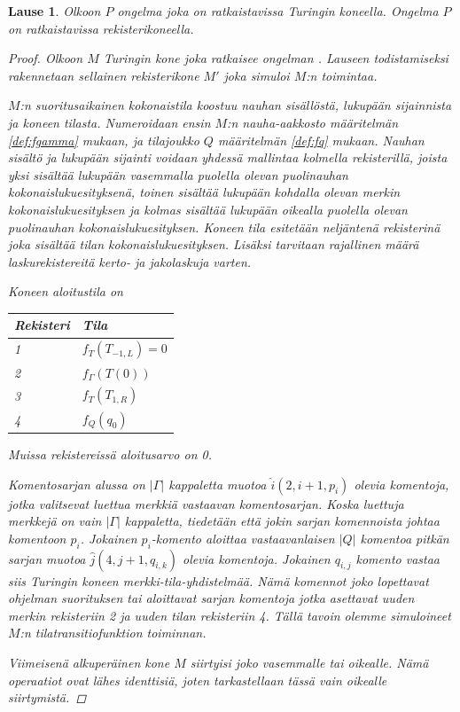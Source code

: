 \documentclass[a4paper, 12pt]{article}
\theoremstyle{definition}
\theoremstyle{plain}
\newtheorem{teor}[mydef]{Lause}
\begin{document}
\begin{teor}
\label{teor:turreg}
Olkoon $P$ ongelma joka on ratkaistavissa Turingin koneella. Ongelma $P$ on ratkaistavissa rekisterikoneella.
\begin{proof}
Olkoon $M$ Turingin kone joka ratkaisee ongelman . Lauseen todistamiseksi rakennetaan sellainen rekisterikone $M'$ joka simuloi $M$:n toimintaa.

$M$:n suoritusaikainen kokonaistila koostuu nauhan sisällöstä, lukupään sijainnista ja koneen tilasta. Numeroidaan ensin $M$:n nauha-aakkosto määritelmän \ref{def:fgamma} mukaan, ja tilajoukko $Q$ määritelmän \ref{def:fq} mukaan. Nauhan sisältö ja lukupään sijainti voidaan yhdessä mallintaa kolmella rekisterillä, joista yksi sisältää lukupään vasemmalla puolella olevan puolinauhan kokonaislukuesityksenä, toinen sisältää lukupään kohdalla olevan merkin kokonaislukuesityksen ja kolmas sisältää lukupään oikealla puolella olevan puolinauhan kokonaislukuesityksen. Koneen tila esitetään neljäntenä rekisterinä joka sisältää tilan kokonaislukuesityksen. Lisäksi tarvitaan rajallinen määrä laskurekistereitä kerto- ja jakolaskuja varten.

Koneen aloitustila on
\begin{center}
\begin{tabular}{l l}
Rekisteri & Tila \\
\hline
1 & $f_T(T_{-1, L}) = 0$ \\
2 & $f_{\Gamma}(T(0))$ \\
3 & $f_T(T_{1, R})$ \\
4 & $f_Q(q_0)$ \\
\end{tabular}
\end{center}
Muissa rekistereissä aloitusarvo on 0.

Komentosarjan alussa on $|\Gamma|$ kappaletta muotoa $\hat{i} (2, i+1, p_i)$ olevia komentoja, jotka valitsevat luettua merkkiä vastaavan komentosarjan. Koska luettuja merkkejä on vain $|\Gamma|$ kappaletta, tiedetään että jokin sarjan komennoista johtaa komentoon $p_i$. Jokainen $p_i$-komento aloittaa vastaavanlaisen $|Q|$ komentoa pitkän sarjan muotoa $\hat{j} (4, j+1, q_{i,k})$  olevia komentoja. Jokainen $q_{i,j}$ komento vastaa siis Turingin koneen merkki-tila-yhdistelmää. Nämä komennot joko lopettavat ohjelman suorituksen tai aloittavat sarjan komentoja jotka asettavat uuden merkin rekisteriin 2 ja uuden tilan rekisteriin 4. Tällä tavoin olemme simuloineet $M$:n tilatransitiofunktion toiminnan.

Viimeisenä alkuperäinen kone $M$ siirtyisi joko vasemmalle tai oikealle. Nämä operaatiot ovat lähes identtisiä, joten tarkastellaan tässä vain oikealle siirtymistä.


\end{proof}
\end{teor}
\end{document}
